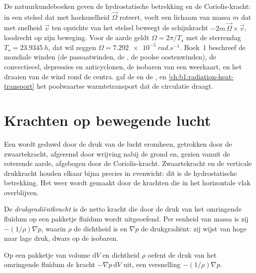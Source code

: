 \begin{recall}
De natuurkundeboeken geven de hydrostatische betrekking en de Coriolis-kracht: in een stelsel dat met hoeksnelheid $\vec\Omega$ roteert, voelt een lichaam van massa $m$ dat met snelheid $\vec v$ ten opzichte van het stelsel beweegt de schijnkracht $-2m\,\vec\Omega\times\vec v$, loodrecht op zijn beweging. Voor de aarde geldt $\Omega = 2\pi/T_\star$ met de sterrendag $T_\star = \qty{23.9345}{h}$, dat wil zeggen
$\Omega = \qty{7.292e-5}{rad.s^{-1}}$. Boek~1 beschreef de mondiale winden (de passaatwinden, de , de poolse oostenwinden), de convectiecel, depressies en anticyclonen, de isobaren van een weerkaart, en het draaien van de wind rond de centra.  gaf de  en de , en \cref{ch:b1:radiation-heat-transport} het poolwaartse warmtetransport dat de circulatie draagt.
\end{recall}

\section{Krachten op bewegende lucht}\label{sec:b1:atmospheric-circulation:forces}

Een  wordt geduwd door de druk van de lucht eromheen, getrokken door de zwaartekracht, afgeremd door wrijving nabij de grond en, gezien vanuit de roterende aarde, afgebogen door de Coriolis-kracht. Zwaartekracht en de verticale drukkracht houden elkaar bijna precies in evenwicht: dit is de hydrostatische betrekking. Het weer wordt gemaakt door de krachten die in het horizontale vlak overblijven.

\begin{definition}[Drukgradiëntkracht]\label{def:b1:atmospheric-circulation:pgf}
De \emph{drukgradiëntkracht} is de netto kracht die door de druk van het omringende fluïdum op een pakketje fluïdum wordt uitgeoefend. Per eenheid van massa is zij $-(1/\rho)\nabla p$, waarin $\rho$ de dichtheid is en $\nabla p$ de drukgradiënt: zij wijst van hoge naar lage druk, dwars op de isobaren.
\end{definition}

\begin{proposition}[De drukgradiëntkracht]\label{prop:b1:atmospheric-circulation:pgf}
Op een pakketje van volume $\mathrm dV$ en dichtheid $\rho$ oefent de druk van het omringende fluïdum de kracht $-\nabla p\,\mathrm dV$ uit, een versnelling $-(1/\rho)\nabla p$.
\end{proposition}

